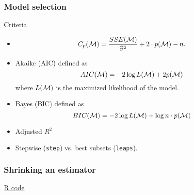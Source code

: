 \documentclass[handout]{beamer}
\begin{document}

   \begin{frame} \frametitle{Model selection}

   \begin{block}
   {Criteria}

   \begin{itemize}

   \item $$
   C_p({\cal M}) = \frac{SSE({\cal M})}{\widehat{\sigma}^2} + 2 \cdot p({\cal M}) - n.$$

   \item Akaike (AIC) defined as
   $$
   AIC({\cal M}) = - 2 \log L({\cal M}) + 2 p({\cal M})
   $$
   where $L({\cal M})$ is the maximized likelihood of the model.

   \item Bayes (BIC) defined as
   $$
   BIC({\cal M}) = - 2 \log L({\cal M}) + \log n \cdot p({\cal M})
   $$

   \item Adjusted $R^2$

   \item Stepwise ({\tt step}) vs. best subsets ({\tt leaps}).

   \end{itemize}
   \end{block}
   \end{frame}



   \begin{frame}
   \frametitle{Shrinking an estimator}
   \begin{center}
   \end{center}
   \href{http://stats191.stanford.edu/selection.html#bias-variance-tradeoff}{R code}
   \end{frame}
\end{document}

